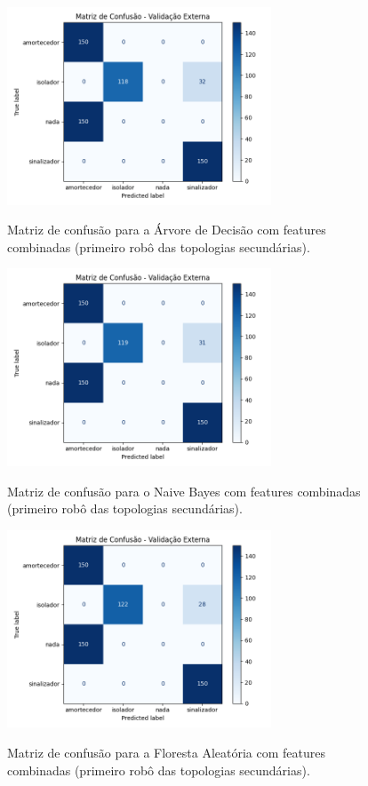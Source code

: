 \begin{figure}[H]
\centering
\caption{Matriz de confusão para a Árvore de Decisão com features combinadas (primeiro robô das topologias secundárias).}
\includegraphics[width=0.7\textwidth]{figuras/Resultados/multi_primeiro_Teste5_tree.png}
\label{fig:mc_featcomb_tree_robo1_t5}
\fonte{}
\end{figure}

\begin{figure}[H]
\centering
\caption{Matriz de confusão para o Naive Bayes com features combinadas (primeiro robô das topologias secundárias).}
\includegraphics[width=0.7\textwidth]{figuras/Resultados/multi_primeiro_Teste5_naive.png}
\label{fig:mc_featcomb_naive_robo1_t5}
\fonte{}
\end{figure}

\begin{figure}[H]
\centering
\caption{Matriz de confusão para a Floresta Aleatória com features combinadas (primeiro robô das topologias secundárias).}
\includegraphics[width=0.7\textwidth]{figuras/Resultados/multi_primeiro_Teste5_rf.png}
\label{fig:mc_featcomb_rf_robo1_t5}
\fonte{}
\end{figure}

